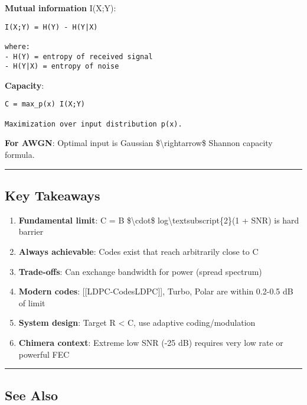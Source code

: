 \textbf{Mutual information} I(X;Y):

\begin{verbatim}
I(X;Y) = H(Y) - H(Y|X)

where:
- H(Y) = entropy of received signal
- H(Y|X) = entropy of noise
\end{verbatim}

\textbf{Capacity}:

\begin{verbatim}
C = max_p(x) I(X;Y)

Maximization over input distribution p(x).
\end{verbatim}

\textbf{For AWGN}: Optimal input is Gaussian
\$\textbackslash rightarrow\$ Shannon capacity formula.

\begin{center}\rule{0.5\linewidth}{0.5pt}\end{center}

\subsection{\texorpdfstring{ Key
Takeaways}{ Key Takeaways}}\label{key-takeaways}

\begin{enumerate}
\def\labelenumi{\arabic{enumi}.}
\tightlist
\item
  \textbf{Fundamental limit}: C = B \$\textbackslash cdot\$
  log\textbackslash textsubscript\{2\}(1 + SNR) is hard barrier
\item
  \textbf{Always achievable}: Codes exist that reach arbitrarily close
  to C
\item
  \textbf{Trade-offs}: Can exchange bandwidth for power (spread
  spectrum)
\item
  \textbf{Modern codes}: {[}{[}LDPC-Codes\textbar LDPC{]}{]}, Turbo,
  Polar are within 0.2-0.5 dB of limit
\item
  \textbf{System design}: Target R \textless{} C, use adaptive
  coding/modulation
\item
  \textbf{Chimera context}: Extreme low SNR (-25 dB) requires very low
  rate or powerful FEC
\end{enumerate}

\begin{center}\rule{0.5\linewidth}{0.5pt}\end{center}

\subsection{\texorpdfstring{ See Also}{ See Also}}\label{see-also}

